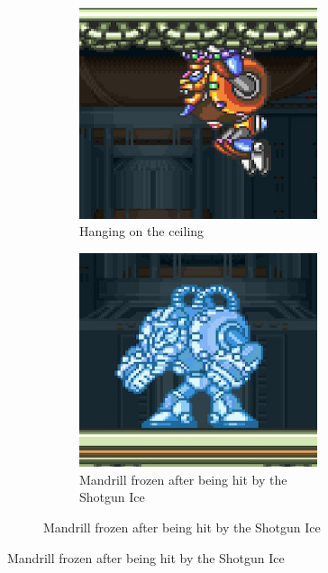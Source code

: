 \begin{figure}[htp]
\begin{figure}[htp]
\begin{subfigure}[t]{0.4\linewidth}
		\centering
		\includegraphics[width=\linewidth]{figures/X1/Spark_mandrill/Mandrill_hang.jpg}
		\caption{Hanging on the ceiling}
	\end{subfigure}
	\begin{subfigure}[t]{0.4\linewidth}
		\centering
		\includegraphics[width=\linewidth]{figures/X1/Spark_mandrill/Mandrill_frozen.jpg}
		\caption{Mandrill frozen after being hit by the Shotgun Ice}

\end{subfigure}
\end{figure}
\end{figure}
